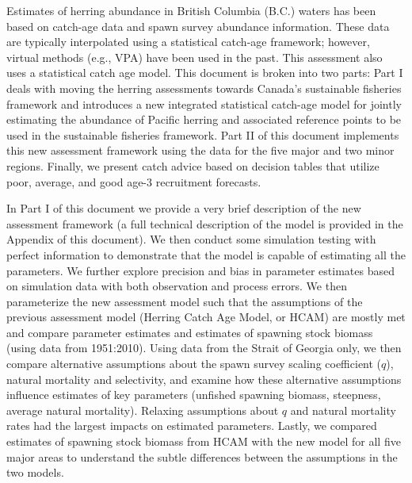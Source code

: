 Estimates of herring abundance in British Columbia (B.C.) waters  has been based on catch-age data and spawn survey abundance information.  These data are typically interpolated using a statistical catch-age framework; however, virtual methods (e.g., VPA) have been used in the past. This assessment also uses a statistical catch age model.  This document is broken into two parts: Part I deals with moving the herring assessments towards Canada's sustainable fisheries framework and introduces a new integrated statistical catch-age model for jointly estimating the abundance of Pacific herring and associated reference points to be used in the sustainable fisheries framework.  Part II of this document  implements this new assessment framework using the data for the five major and two minor regions.  Finally, we present catch advice based on decision tables that utilize poor, average, and good age-3 recruitment forecasts.

In Part I of this document we provide a very brief description of the new assessment framework (a full technical description of the model is provided in the Appendix of this document).  We then conduct some simulation testing with perfect information to  demonstrate that the model is capable of estimating all the parameters. We further explore precision and bias in parameter estimates based on simulation data with both observation and process errors.  We then parameterize the new assessment model such that the assumptions of the previous assessment model (Herring Catch Age Model, or HCAM) are mostly met and compare parameter estimates and estimates of spawning stock biomass (using data from 1951:2010).  Using data from the Strait of Georgia only, we then compare alternative assumptions about the spawn survey scaling coefficient ($q$), natural mortality and selectivity, and examine how these alternative assumptions influence estimates of key parameters (unfished spawning biomass, steepness, average natural mortality).  Relaxing assumptions about $q$ and natural mortality rates had the largest impacts on estimated parameters.  Lastly, we compared estimates of spawning stock biomass from HCAM with the new model for all five major areas to understand the subtle differences between the assumptions in the two models.%

